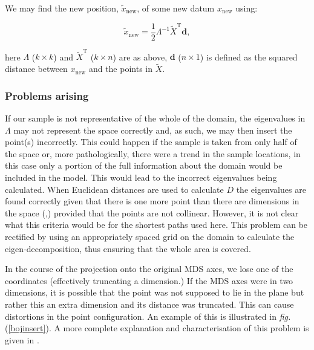 \documentclass[a4paper,10pt]{article}
\newcommand{\fig}[1]{\emph{fig.} (\ref{#1})}
\newcommand{\tr}[1]{#1^{\text{T}}}
\newcommand{\cross}{\times}
\begin{document}
We may find the new position, $\tilde{x}_{\text{new}}$, of some new datum $x_{\text{new}}$ using:

\begin{equation}
\tilde{x}_{\text{new}} = \frac{1}{2} \Lambda^{-1} \tr{\tilde{X}} \mathbf{d},
\label{gower}
\end{equation}

here $\Lambda$ ($k \cross k$) and $\tr{\tilde{X}}$ ($k \cross n$) are as above, $\mathbf{d}$ ($n \cross 1$) is defined as the squared distance between $x_{\text{new}}$ and the points in $\tilde{X}$.


\subsubsection{Problems arising}

If our sample is not representative of the whole of the domain, the eigenvalues in $\Lambda$ may not represent the space correctly and, as such, we may then insert the point(s) incorrectly. This could happen if the sample is taken from only half of the space or, more pathologically, there were a trend in the sample locations, in this case only a portion of the full information about the domain would be included in the model. This would lead to the incorrect eigenvalues being calculated. When Euclidean distances are used to calculate $D$ the eigenvalues are found correctly given that there is one more point than there are dimensions in the space (\cite{landmark},) provided that the points are not collinear. However, it is not clear what this criteria would be for the shortest paths used here. This problem can be rectified by using an appropriately spaced grid on the domain to calculate the eigen-decomposition, thus ensuring that the whole area is covered.

In the course of the projection onto the original MDS axes, we lose one of the coordinates (effectively truncating a dimension.) If the MDS axes were in two dimensions, it is possible that the point was not supposed to lie in the plane but rather this an extra dimension and its distance was truncated. This can cause distortions in the point configuration. An example of this is illustrated in \fig{bojinsert}. A more complete explanation and characterisation of this problem is given in \cite{Boj2009}. 
\end{document}
